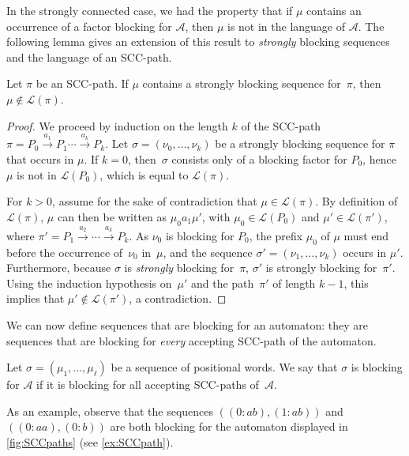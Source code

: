 \documentclass[letterpaper, USenglish, cleveref, autoref, thm-restate, numberwithinsect]{lipics-v2021}
\theoremstyle{theorem}
\theoremstyle{definition}
\newcommand{\Aa}{\mathcal{A}}
\newcommand{\lang}[1]{\mathcal{L}(#1)}
\newcommand{\SCCpath}{\pi}
\newcommand{\timedword}[2]{(#1:#2)}
\begin{document}
In the strongly connected case, we had the property that if $\mu$ contains an occurrence of a factor blocking for $\Aa$, then $\mu$ is not in the language of $\Aa$.
The following lemma gives an extension of this result to \emph{strongly} blocking sequences and the language of an SCC-path.
\begin{lemma}\label{lem:strongly-blocking-implies-not-in-path}
	Let $\SCCpath$ be an SCC-path.
    If $\mu$ contains a strongly blocking sequence for~$\SCCpath$,
    then $\mu \notin \lang{\SCCpath}$.
\end{lemma}
\begin{proof}
	We proceed by induction on the length $k$ of the SCC-path $\SCCpath =  P_0 \xrightarrow{a_1} P_1 \cdots \xrightarrow{a_k} P_k$.
	Let $\sigma = (\nu_0,\ldots, \nu_k)$ be a strongly blocking sequence for $\SCCpath$ that occurs in $\mu$.
	If $k = 0$, then~$\sigma$ consists only of a blocking factor for $P_0$, hence $\mu$ is not in $\lang{P_0}$, which is equal to $\lang{\SCCpath}$.

	For $k > 0$, assume for the sake of contradiction that $\mu\in\lang{\SCCpath}$. By definition of $\lang{\SCCpath}$,
	$\mu$ can then be written as $\mu_0a_1\mu'$, with $\mu_0\in \lang{P_0}$ and $\mu' \in\lang{\SCCpath'}$, where $\SCCpath' = P_1 \xrightarrow{a_2}\cdots \xrightarrow{a_k} P_k$.
	As $\nu_0$ is blocking for $P_0$, the prefix $\mu_0$ of $\mu$ must end before the occurrence of~$\nu_0$ in~$\mu$, and the sequence $\sigma' = (\nu_1,\ldots, \nu_k)$ occurs in $\mu'$. 
	Furthermore, because $\sigma$ is \emph{strongly} blocking for~$\SCCpath$, $\sigma'$ is strongly blocking for~$\SCCpath'$.
	Using the induction hypothesis on~$\mu'$ and the path~$\SCCpath'$ of length $k-1$, this implies that $\mu' \notin\lang{\SCCpath'}$, a contradiction.
\end{proof}

We can now define sequences that are blocking for an automaton: they are sequences that are blocking for \emph{every} accepting SCC-path of the automaton.
\begin{definition}[{Blocking sequence for $\Aa$}]
    Let $\sigma = (\mu_1, \ldots, \mu_\ell)$ be a sequence of positional words.
    We say that $\sigma$ is blocking for $\Aa$ if it is blocking for all accepting SCC-paths of~$\Aa$.
\end{definition}
As an example, observe that the sequences $(\timedword{0}{ab}, \timedword{1}{ab})$ and $(\timedword{0}{aa}, \timedword{0}{b})$ are both blocking for the automaton displayed in \cref{fig:SCCpaths} (see \cref{ex:SCCpath}).
\end{document}
